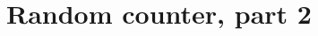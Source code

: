 \documentclass[11pt]{537homework}
\begin{document}
\endgroup
\section{Random counter, part 2}


\end{document}
